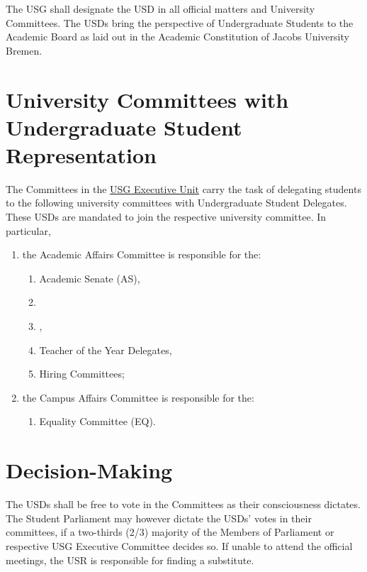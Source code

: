 
The USG shall designate the \ac{USD} in all official matters and University Committees. The USDs bring the perspective of Undergraduate Students to the Academic Board as laid out in the Academic Constitution of Jacobs University Bremen. 

\section{University Committees with Undergraduate Student Representation}
The Committees in the \hyperref[USGexecutiveUnitDef]{USG Executive Unit} carry the task of delegating students to the following university committees with Undergraduate Student Delegates. These USDs are mandated to join the respective university committee. In particular,
\begin{enumerate}
\item the Academic Affairs Committee is responsible for  the:
\begin{enumerate}
    \item Academic Senate (AS),
    \item {}
    \item {},
    \item Teacher of the Year Delegates,
    \item Hiring Committees;
\end{enumerate}

\item the Campus Affairs Committee is responsible for  the:
\begin{enumerate}
    \item Equality Committee (EQ).
\end{enumerate}
\end{enumerate}

\section{Decision-Making}
The USDs shall be free to vote in the  Committees as their consciousness dictates. The Student Parliament may however dictate the USDs' votes in their  committees, if a two-thirds (2/3) majority of the Members of Parliament or respective USG Executive Committee decides so. If unable to attend the official meetings, the USR is responsible for finding a substitute.


